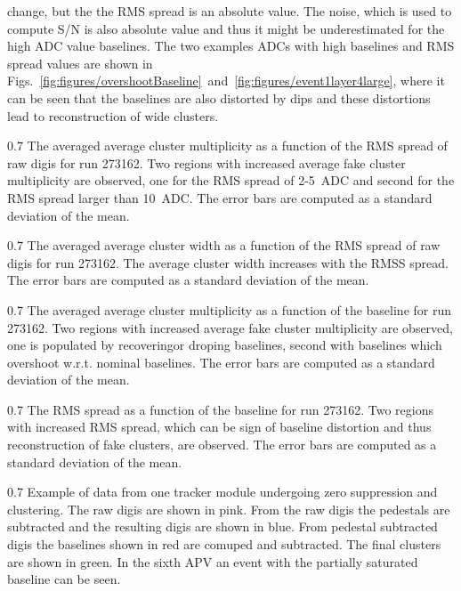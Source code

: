 change, but the the RMS spread is an absolute value. The noise, which is used to compute S/N is also absolute value and thus it might be underestimated for the high ADC value baselines. The two examples ADCs with high baselines and RMS spread values are shown in Figs.~\ref{fig:figures/overshootBaseline}~and~\ref{fig:figures/event1layer4large}, where it can be seen that the baselines are also distorted by dips and these distortions lead to reconstruction of wide clusters.


                 {0.7}       %
                 {The averaged average cluster multiplicity as a function of the RMS spread of raw digis for run 273162. Two regions with increased average fake cluster multiplicity are observed, one for the RMS spread of 2-5~ADC and second for the RMS spread larger than 10~ADC. The error bars are computed as a standard deviation of the mean. } %

                 {0.7}       %
                 {The averaged average cluster width as a function of the RMS spread of raw digis for run 273162. The average cluster width increases with the RMSS spread. The error bars are computed as a standard deviation of the mean. } %

                 {0.7}       %
                 {The averaged average cluster multiplicity as a function of the baseline for run 273162. Two regions with increased average fake cluster multiplicity are observed, one is populated by recoveringor droping baselines, second with baselines which overshoot w.r.t. nominal baselines.  The error bars are computed as a standard deviation of the mean. } %


                 {0.7}       %
                 {The RMS spread as a function of the baseline for run 273162. Two regions with increased RMS spread, which can be sign of baseline distortion and thus reconstruction of fake clusters, are observed.  The error bars are computed as a standard deviation of the mean. } %


                 {0.7}       %
                 {Example of data from one tracker module undergoing zero suppression and clustering. The raw digis are shown in pink. From the raw digis the pedestals are subtracted and the resulting digis are shown in blue. From pedestal subtracted digis the baselines shown in red are comuped and subtracted. The final clusters are shown in green. In the sixth APV an event with the partially saturated baseline can be seen.} %

